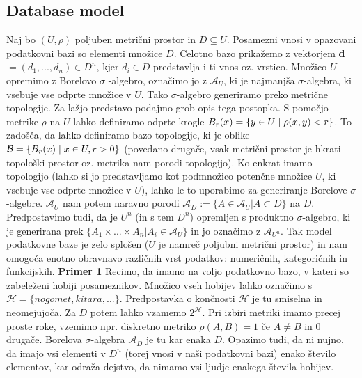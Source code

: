 \documentclass[mat1]{article}
\theoremstyle{definition}
\begin{document}
\subsection{Database model}
Naj bo $(U, \rho)$ poljuben metrični prostor in $D \subseteq U$. Posamezni vnosi v opazovani podatkovni bazi so elementi množice $D$. Celotno bazo prikažemo z vektorjem \textbf{d} $= (d_{1}, ..., d_{n}) \in D^n$, kjer $d_{i} \in D$ predstavlja i-ti vnos oz. vrstico. 
\newline
\newline
Množico $U$ opremimo z Borelovo $\sigma$ -algebro, označimo jo z $\mathcal{A}_{U}$, ki je najmanjša $\sigma$-algebra, ki vsebuje vse odprte množice v $U$. Tako $\sigma$-algebro generiramo preko metrične topologije. Za lažjo predstavo podajmo grob opis tega postopka. S pomočjo metrike $\rho$ na $U$ lahko definiramo odprte krogle  $B_{r}(x) = \{y \in U\hspace{0.1cm}|\hspace{0.1cm}\rho(x,y) < r\}$. To zadošča, da lahko definiramo bazo topologije, ki je oblike $\mathcal{B} = \{B_{r}(x)\hspace{0.1cm}|\hspace{0.1cm}x \in U, r>0\}$ (povedano drugače, vsak metrični prostor je hkrati topološki prostor oz. metrika nam porodi topologijo). Ko enkrat imamo topologijo  (lahko si jo predstavljamo kot podmnožico potenčne množice $U$, ki vsebuje vse odprte množice v $U$), lahko le-to uporabimo za generiranje Borelove $\sigma$-algebre.
\newline
\newline
$\mathcal{A}_{U}$ nam potem naravno porodi $\mathcal{A}_{D} := \{A \in \mathcal{A}_{U} | A \subset D \}$ na $D$. Predpostavimo tudi, da je $U^n$ (in s tem $D^n$) opremljen s produktno $\sigma$-algebro, ki je generirana prek $\{A_{1} \times ... \times A_{n} | A_{i} \in \mathcal{A}_{U}\}$ in jo označimo z $\mathcal{A}_{U^n}$. 
\newline
\newline
Tak model podatkovne baze je zelo splošen ($U$ je namreč poljubni metrični prostor) in nam omogoča enotno obravnavo različnih vrst podatkov: numeričnih, kategoričnih in funkcijskih.
\newline
\newline
\textbf{Primer 1}  Recimo, da imamo na voljo podatkovno bazo, v kateri so zabeleženi hobiji posameznikov. Množico vseh hobijev lahko označimo s $\mathcal{H}=\{nogomet, kitara,...\}$. Predpostavka o končnosti $\mathcal{H}$ je tu smiselna in neomejujoča. Za $D$ potem lahko vzamemo $2^\mathcal{H}$. Pri izbiri metriki imamo precej proste roke, vzemimo npr. diskretno metriko  $\rho(A,B)=1$ če $A \neq B$ in 0 drugače. Borelova $\sigma$-algebra $\mathcal{A}_{D}$ je tu kar enaka $D$. Opazimo tudi, da ni nujno, da imajo vsi elementi v $D^n$ (torej vnosi v naši podatkovni bazi) enako število elementov, kar odraža dejstvo, da nimamo vsi ljudje enakega števila hobijev.
\end{document}
